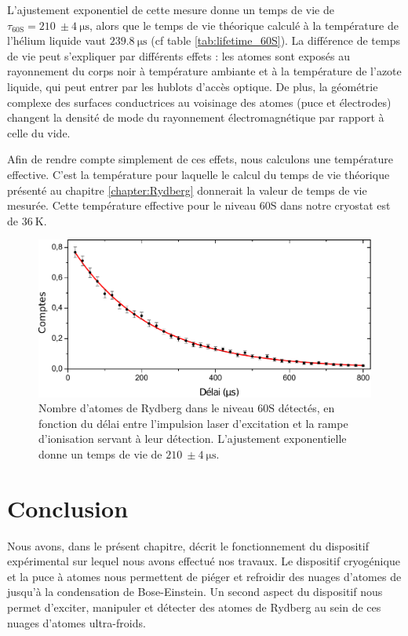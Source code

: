 L'ajustement exponentiel de cette mesure donne un temps de vie de $\tau_{\mathrm{60S}} = \SI{210}{} \pm \SI{4}{\us}$, alors que le temps de vie théorique calculé à la température de l'hélium liquide vaut $\SI{239.8}{\us}$ (cf table \ref{tab:lifetime_60S}).
La différence de temps de vie peut s'expliquer par différents effets :
les atomes sont exposés au rayonnement du corps noir à température ambiante et à la température de l'azote liquide, qui peut entrer par les hublots d'accès optique.
De plus, la géométrie complexe des surfaces conductrices au voisinage des atomes (puce et électrodes) changent la densité de mode du rayonnement électromagnétique par rapport à celle du vide.

Afin de rendre compte simplement de ces effets, nous calculons une température effective.
C'est la température pour laquelle le calcul du temps de vie théorique présenté au chapitre \ref{chapter:Rydberg} donnerait la valeur de temps de vie mesurée.
Cette température effective pour le niveau $\mathrm{60S}$ dans notre cryostat est de $\SI{36}{\kelvin}$.

\begin{figure}[h]
\centering
\includegraphics[width=0.8\linewidth]{figures/setup/rydberg/lifetime_60S}
\caption[Durée de vie du niveau 60S]{
Nombre d'atomes de Rydberg dans le niveau $\mathrm{60S}$ détectés, en fonction du délai entre l'impulsion laser d'excitation et la rampe d'ionisation servant à leur détection.
L'ajustement exponentielle donne un temps de vie de $\SI{210}{} \pm \SI{4}{\us}$.
}
\label{fig:lifetime_60S}
\end{figure}

\section*{Conclusion}
\noindent Nous avons, dans le présent chapitre, décrit le fonctionnement du dispositif expérimental sur lequel nous avons effectué nos travaux.
Le dispositif cryogénique et la puce à atomes nous permettent de piéger et refroidir des nuages d'atomes de  jusqu'à la condensation de Bose-Einstein.
Un second aspect du dispositif nous permet d'exciter, manipuler et détecter des atomes de Rydberg au sein de ces nuages d'atomes ultra-froids.

